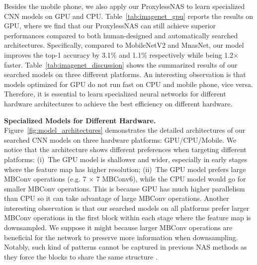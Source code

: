 \documentclass{article} \usepackage{iclr2019_conference,times}
\newcommand{\minisection}[1]{\vspace{5pt}\noindent\textbf{#1.}}
\begin{document}
Besides the mobile phone, we also apply our ProxylessNAS to learn specialized CNN models on GPU and CPU. Table~\ref{tab:imagenet_gpu} reports the results on GPU, where we find that our ProxylessNAS can still achieve superior performances compared to both human-designed and automatically searched architectures. Specifically, compared to MobileNetV2 and MnasNet, our model improves the top-1 accuracy by 3.1\% and 1.1\% respectively while being 1.2$\times$ faster. Table~\ref{tab:imagenet_discussion} shows the summarized results of our searched models on three different platforms. An interesting observation is that models optimized for GPU do not run fast on CPU and mobile phone, vice versa. Therefore, it is essential to learn specialized neural networks for different hardware architectures to achieve the best efficiency on different hardware.

\minisection{Specialized Models for Different Hardware} Figure~\ref{fig:model_architectures} demonstrates the detailed architectures of our searched CNN models on three hardware platforms: GPU/CPU/Mobile. We notice that the architecture shows different preferences when targeting different platforms:  (i)~The GPU model is shallower and wider, especially in early stages where the feature map has higher resolution; (ii)~The GPU model prefers large MBConv operations (e.g. 7 $\times$ 7 MBConv6), while the CPU model would go for smaller MBConv operations. This is because GPU has much higher parallelism than CPU so it can take advantage of large MBConv operations. Another interesting observation is that our searched models on all platforms prefer larger MBConv operations in the first block within each stage where the feature map is downsampled. We suppose it might because larger MBConv operations are beneficial for the network to preserve more information when downsampling. Notably, such kind of patterns cannot be captured in previous NAS methods as they force the blocks to share the same structure \citep{zoph2017learning,liu2017progressive}. 
\end{document}
